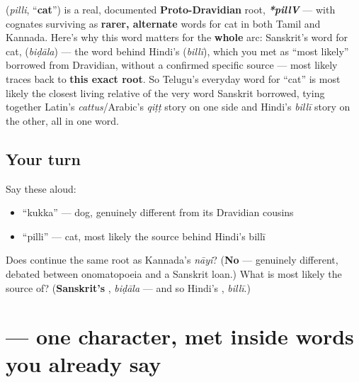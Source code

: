 \begin{cousinweb}
\textbf{} (\emph{pilli}, \textquotedblleft{}\textbf{cat}\textquotedblright{}) is a real, documented \textbf{Proto-Dravidian} root, \emph{\textbf{*pillV}} — with cognates surviving as \textbf{rarer, alternate} words for cat in both Tamil and Kannada. Here's why this word matters for the \textbf{whole} arc: Sanskrit's word for cat, \textbf{} (\emph{biḍāla}) — the word behind Hindi's \textbf{} (\emph{billī}), which you met as \textquotedblleft{}most likely\textquotedblright{} borrowed from Dravidian, without a confirmed specific source — most likely traces back to \textbf{this exact root}. So Telugu's everyday word for \textquotedblleft{}cat\textquotedblright{} is most likely the closest living relative of the very word Sanskrit borrowed, tying together Latin's \emph{cattus}/Arabic's \emph{qiṭṭ} story on one side and Hindi's \emph{billī} story on the other, all in one word.
\end{cousinweb}

\subsection*{Your turn}
Say these aloud:

\begin{itemize}
\raggedright
  \item \textquotedblleft{}kukka\textquotedblright{} — dog, genuinely different from its Dravidian cousins
  \item \textquotedblleft{}pilli\textquotedblright{} — cat, most likely the source behind Hindi's billī
\end{itemize}

\begin{tcolorbox}[breakable,colback=teal!4,colframe=teal!35!black,title={Before you move on}]
Does \textbf{} continue the same root as Kannada's \emph{nāyi}? (\textbf{No} — genuinely different, debated between onomatopoeia and a Sanskrit loan.) What is \textbf{} most likely the source of? (\textbf{Sanskrit's }, \emph{biḍāla} — and so Hindi's \textbf{}, \emph{billī}.)
\end{tcolorbox}
\section[\texorpdfstring{\te{ఎ} (e)}{ఎ (e)}]{ — one character, met inside words you already say}

\label{lesson:TE-S124-letter-e}



